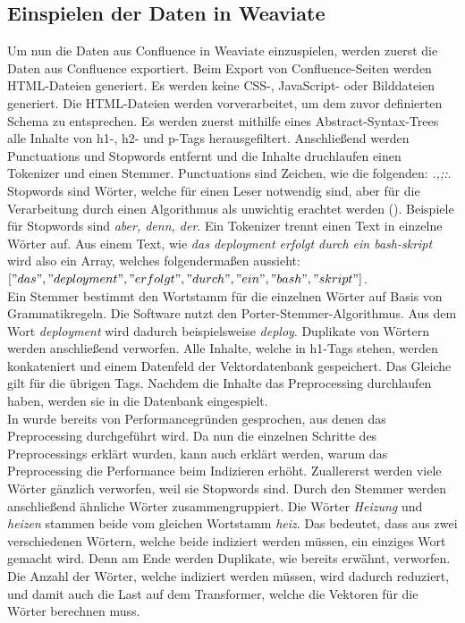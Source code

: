 \subsection{Einspielen der Daten in Weaviate}
\label{chap:einspielen-der-daten-in-weaviate}
Um nun die Daten aus Confluence in Weaviate einzuspielen, werden zuerst die Daten aus Confluence exportiert.
Beim Export von Confluence-Seiten werden HTML-Dateien generiert.
Es werden keine CSS-, JavaScript- oder Bilddateien generiert.
Die HTML-Dateien werden vorverarbeitet, um dem zuvor definierten Schema zu entsprechen.
Es werden zuerst mithilfe eines Abstract-Syntax-Trees alle Inhalte von h1-, h2- und p-Tags herausgefiltert.
Anschließend werden Punctuations und Stopwords entfernt und die Inhalte druchlaufen einen Tokenizer und einen Stemmer.
Punctuations sind Zeichen, wie die folgenden: \textit{.,;:}.
Stopwords sind Wörter, welche für einen Leser notwendig sind, aber für die Verarbeitung durch einen Algorithmus als unwichtig erachtet werden (\cite{Sarica_Luo_2021}).
Beispiele für Stopwords sind \textit{aber, denn, der}.
Ein Tokenizer trennt einen Text in einzelne Wörter auf.
Aus einem Text, wie \textit{das deployment erfolgt durch ein bash-skript} wird also ein Array, welches folgendermaßen aussieht:\\

\(["das", "deployment", "erfolgt", "durch", "ein", "bash", "skript"]\).\\

Ein Stemmer bestimmt den Wortstamm für die einzelnen Wörter auf Basis von Grammatikregeln.
Die Software nutzt den Porter-Stemmer-Algorithmus.
Aus dem Wort \textit{deployment} wird dadurch beispielsweise \textit{deploy}.
Duplikate von Wörtern werden anschließend verworfen.
Alle Inhalte, welche in h1-Tags stehen, werden konkateniert und einem Datenfeld der Vektordatenbank gespeichert.
Das Gleiche gilt für die übrigen Tags.
Nachdem die Inhalte das Preprocessing durchlaufen haben, werden sie in die Datenbank eingespielt.\\

In  wurde bereits von Performancegründen gesprochen, aus denen das Preprocessing durchgeführt wird.
Da nun die einzelnen Schritte des Preprocessings erklärt wurden, kann auch erklärt werden, warum das Preprocessing die Performance beim Indizieren erhöht.
Zuallererst werden viele Wörter gänzlich verworfen, weil sie Stopwords sind.
Durch den Stemmer werden anschließend ähnliche Wörter zusammengruppiert.
Die Wörter \textit{Heizung} und \textit{heizen} stammen beide vom gleichen Wortstamm \textit{heiz}.
Das bedeutet, dass aus zwei verschiedenen Wörtern, welche beide indiziert werden müssen, ein einziges Wort gemacht wird.
Denn am Ende werden Duplikate, wie bereits erwähnt, verworfen.
Die Anzahl der Wörter, welche indiziert werden müssen, wird dadurch reduziert, und damit auch die Last auf dem Transformer, welche die Vektoren für die Wörter berechnen muss.


